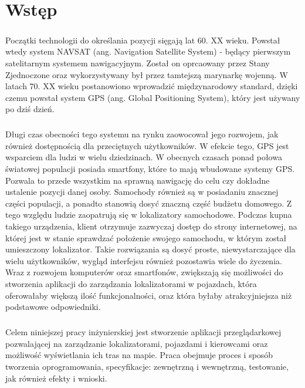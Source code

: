 \chapter{Wstęp}
\label{ch:wstep}

\paragraph{}
Początki technologii do określania pozycji sięgają lat 60. XX wieku. Powstał wtedy system NAVSAT (ang. Navigation Satellite System) - będący pierwszym satelitarnym systemem nawigacyjnym. Został on oprcaowany przez Stany Zjednoczone oraz wykorzystywany był przez tamtejszą marynarkę wojenną. W latach 70. XX wieku postanowiono wprowadzić międzynarodowy standard, dzięki czemu powstał system GPS (ang. Global Positioning System), który jest używany po dziś dzień.

\paragraph{}
Długi czas obecności tego systemu na rynku zaowocował jego rozwojem, jak również dostępnością dla przeciętnych użytkowników. W efekcie tego, GPS jest wsparciem dla ludzi w wielu dziedzinach. W obecnych czasach ponad połowa światowej populacji posiada smartfony, które to mają wbudowane systemy GPS. Pozwala to przede wszystkim na sprawną nawigację do celu czy  dokładne ustalenie pozycji danej osoby. Samochody również są w posiadaniu znacznej części populacji, a ponadto stanowią dosyć znaczną część budżetu domowego. Z tego względu ludzie zaopatrują się w lokalizatory samochodowe. Podczas kupna takiego urządzenia, klient otrzymuje zazwyczaj dostęp do strony internetowej, na której jest w stanie sprawdzać położenie swojego samochodu, w którym został umieszczony lokalizator. Takie rozwiązania są dosyć proste, niewystarczające dla wielu użytkowników, wygląd interfejsu również pozostawia wiele do życzenia. Wraz z rozwojem komputerów oraz smartfonów, zwiększają się możliwości do stworzenia aplikacji do zarządzania lokalizatorami w pojazdach, która oferowałaby większą ilość funkcjonalności, oraz która byłaby atrakcyjniejsza niż podstawowe odpowiedniki.

\paragraph{}
Celem niniejszej pracy inżynierskiej jest stworzenie aplikacji przeglądarkowej pozwalającej na zarządzanie lokalizatorami, pojazdami i kierowcami oraz możliwość wyświetlania ich tras na mapie. Praca obejmuje proces i sposób tworzenia oprogramowania, specyfikacje: zewnętrzną i wewnętrzną,  testowanie, jak również efekty i wnioski.

